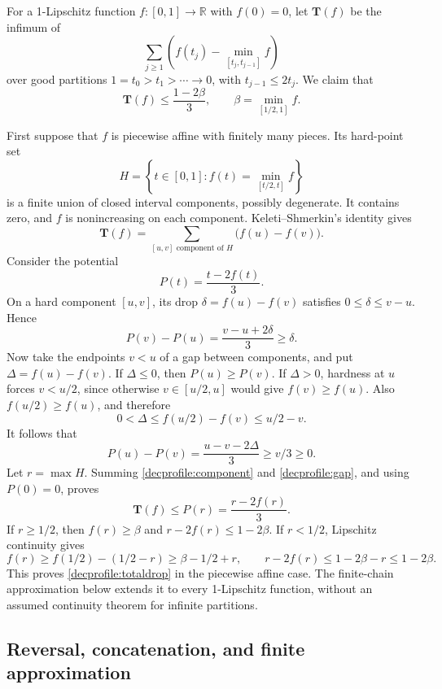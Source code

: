 For a 1-Lipschitz function \(f:[0,1]\to\mathbb R\) with \(f(0)=0\),
let \(\mathbf T(f)\) be the infimum of
\[
 \sum_{j\ge1}\left(f(t_j)-\min_{[t_j,t_{j-1}]}f\right)
\]
over good partitions \(1=t_0>t_1>\cdots\to0\), with
\(t_{j-1}\le2t_j\). We claim that
\begin{equation}\label{decprofile:totaldrop}
 \mathbf T(f)\le\frac{1-2\beta}{3},
 \qquad \beta=\min_{[1/2,1]}f.
\end{equation}

First suppose that \(f\) is piecewise affine with finitely many pieces.
Its hard-point set
\[
 H=\left\{t\in[0,1]: f(t)=\min_{[t/2,t]}f\right\}
\]
is a finite union of closed interval components, possibly degenerate.
It contains zero, and \(f\) is nonincreasing on each component.
Keleti--Shmerkin's identity \cite[Lemma 5.4]{ks} gives
\begin{equation}\label{decprofile:hardidentity}
 \mathbf T(f)=
 \sum_{[u,v]\text{ component of }H}\bigl(f(u)-f(v)\bigr).
\end{equation}
Consider the potential
\[
 P(t)=\frac{t-2f(t)}3.
\]
On a hard component \([u,v]\), its drop
\(\delta=f(u)-f(v)\) satisfies \(0\le\delta\le v-u\). Hence
\begin{equation}\label{decprofile:component}
 P(v)-P(u)=\frac{v-u+2\delta}{3}\ge\delta.
\end{equation}
Now take the endpoints \(v<u\) of a gap between components, and put
\(\Delta=f(u)-f(v)\). If \(\Delta\le0\), then \(P(u)\ge P(v)\).
If \(\Delta>0\), hardness at \(u\) forces \(v<u/2\), since otherwise
\(v\in[u/2,u]\) would give \(f(v)\ge f(u)\). Also
\(f(u/2)\ge f(u)\), and therefore
\[
 0<\Delta\le f(u/2)-f(v)\le u/2-v.
\]
It follows that
\begin{equation}\label{decprofile:gap}
 P(u)-P(v)=\frac{u-v-2\Delta}{3}\ge v/3\ge0.
\end{equation}
Let \(r=\max H\). Summing
\eqref{decprofile:component} and \eqref{decprofile:gap}, and using
\(P(0)=0\), proves
\[
 \mathbf T(f)\le P(r)=\frac{r-2f(r)}3.
\]
If \(r\ge1/2\), then \(f(r)\ge\beta\) and
\(r-2f(r)\le1-2\beta\). If \(r<1/2\), Lipschitz continuity gives
\[
 f(r)\ge f(1/2)-(1/2-r)\ge\beta-1/2+r,
 \qquad r-2f(r)\le1-2\beta-r\le1-2\beta.
\]
This proves \eqref{decprofile:totaldrop} in the piecewise affine case.
The finite-chain approximation below extends it to every 1-Lipschitz
function, without an assumed continuity theorem for infinite partitions.

\subsection{Reversal, concatenation, and finite approximation}
\label{decprofile:proof}

